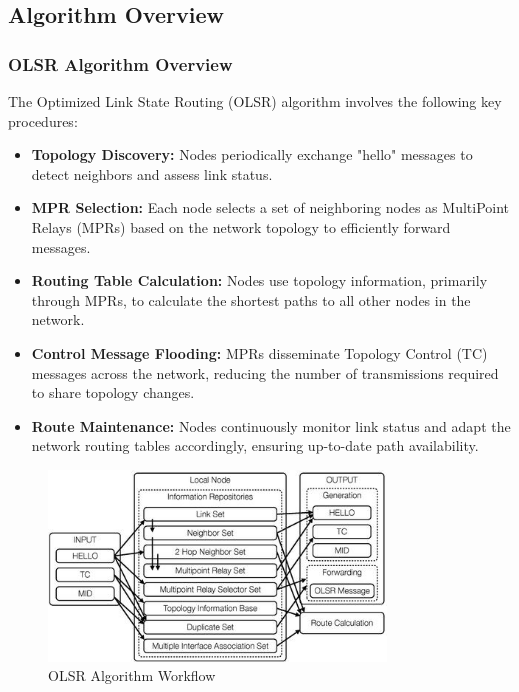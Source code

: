 \documentclass[11pt]{beamer}              %
\begin{document}
\subsection{Algorithm Overview}
\begin{frame}
\frametitle{OLSR Algorithm Overview}

The Optimized Link State Routing (OLSR) algorithm involves the following key procedures:

\begin{itemize}
    \item \textbf{Topology Discovery:} Nodes periodically exchange "hello" messages to detect neighbors and assess link status.
    \item \textbf{MPR Selection:} Each node selects a set of neighboring nodes as MultiPoint Relays (MPRs) based on the network topology to efficiently forward messages.
    \item \textbf{Routing Table Calculation:} Nodes use topology information, primarily through MPRs, to calculate the shortest paths to all other nodes in the network.
    \item \textbf{Control Message Flooding:} MPRs disseminate Topology Control (TC) messages across the network, reducing the number of transmissions required to share topology changes.
    \item \textbf{Route Maintenance:} Nodes continuously monitor link status and adapt the network routing tables accordingly, ensuring up-to-date path availability.
\end{itemize}

\end{frame}

\begin{frame}
    \begin{figure}
        \centering
        \includegraphics[width=0.8\textwidth]{figures/olsr_overview.jpg}
        \caption{OLSR Algorithm Workflow \cite{wiki:olsr}}
    \end{figure}    
\end{frame}
\end{document}
